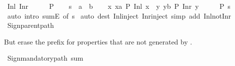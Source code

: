 \begin{isabellebody}
\endisatagML
{\isafoldML}%
%
\isadelimML
%
\endisadelimML
\isanewline
\isanewline
{}\isamarkupfalse%
\ Inl\ Inr\isanewline
%
\isadelimproof
%
\endisadelimproof
%
\isatagproof
{}\isamarkupfalse%
\ {\isacharminus}{\kern0pt}\isanewline
\ \ \isamarkupfalse%
\ P\isanewline
\ \ \isamarkupfalse%
\ s\ {\isacharcolon}{\kern0pt}{\isacharcolon}{\kern0pt}\ {\isachardoublequoteopen}{\isacharprime}{\kern0pt}a\ {\isacharplus}{\kern0pt}\ {\isacharprime}{\kern0pt}b{\isachardoublequoteclose}\isanewline
\ \ \isamarkupfalse%
\ x{\isacharcolon}{\kern0pt}\ {\isachardoublequoteopen}{\isasymAnd}x{\isacharcolon}{\kern0pt}{\isacharcolon}{\kern0pt}{\isacharprime}{\kern0pt}a{\isachardot}{\kern0pt}\ P\ {\isacharparenleft}{\kern0pt}Inl\ x{\isacharparenright}{\kern0pt}{\isachardoublequoteclose}\ \ y{\isacharcolon}{\kern0pt}\ {\isachardoublequoteopen}{\isasymAnd}y{\isacharcolon}{\kern0pt}{\isacharcolon}{\kern0pt}{\isacharprime}{\kern0pt}b{\isachardot}{\kern0pt}\ P\ {\isacharparenleft}{\kern0pt}Inr\ y{\isacharparenright}{\kern0pt}{\isachardoublequoteclose}\isanewline
\ \ \isamarkupfalse%
\ \isamarkupfalse%
\ {\isachardoublequoteopen}P\ s{\isachardoublequoteclose}\ \isamarkupfalse%
\ {\isacharparenleft}{\kern0pt}auto\ intro{\isacharcolon}{\kern0pt}\ sumE\ {\isacharbrackleft}{\kern0pt}of\ s{\isacharbrackright}{\kern0pt}{\isacharparenright}{\kern0pt}\isanewline
{}\isamarkupfalse%
\ {\isacharparenleft}{\kern0pt}auto\ dest{\isacharcolon}{\kern0pt}\ Inl{\isacharunderscore}{\kern0pt}inject\ Inr{\isacharunderscore}{\kern0pt}inject\ simp\ add{\isacharcolon}{\kern0pt}\ Inl{\isacharunderscore}{\kern0pt}not{\isacharunderscore}{\kern0pt}Inr{\isacharparenright}{\kern0pt}%
\endisatagproof
{\isafoldproof}%
%
\isadelimproof
\isanewline
%
\endisadelimproof
%
\isadelimML
\isanewline
%
\endisadelimML
%
\isatagML
{}\isamarkupfalse%
\ {\isacartoucheopen}Sign{\isachardot}{\kern0pt}parent{\isacharunderscore}{\kern0pt}path{\isacartoucheclose}%
\endisatagML
{\isafoldML}%
%
\isadelimML
%
\endisadelimML
%
\begin{isamarkuptext}%
But erase the prefix for properties that are not generated by .%
\end{isamarkuptext}\isamarkuptrue%
%
\isadelimML
%
\endisadelimML
%
\isatagML
{}\isamarkupfalse%
\ {\isacartoucheopen}Sign{\isachardot}{\kern0pt}mandatory{\isacharunderscore}{\kern0pt}path\ {\isachardoublequote}{\kern0pt}sum{\isachardoublequote}{\kern0pt}{\isacartoucheclose}%

\end{isabellebody}

